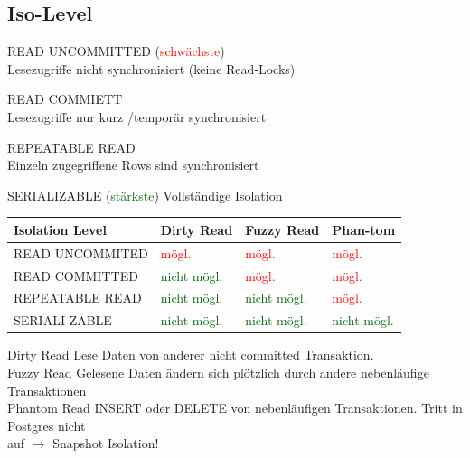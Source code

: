 \documentclass[10pt,landscape,a4paper]{scrartcl}
\begin{document}
\begin{multicols*}{5}
\subsection{Iso-Level}
\begin{compactitem} [$\bullet$]
	\item \textcolor{b}{READ UNCOMMITTED} (\textcolor{red}{schwächste})\\
	Lesezugriffe nicht synchronisiert (keine Read-Locks) 
	\item \textcolor{b}{READ COMMIETT}\\
	Lesezugriffe nur kurz /temporär synchronisiert
	\item \textcolor{b}{REPEATABLE READ}\\
	Einzeln zugegriffene Rows sind synchronisiert
	\item \textcolor{b}{SERIALIZABLE} (\textcolor{darkgreen}{stärkste})
	Vollständige Isolation
\end{compactitem}
\begin{tabular}{|p{1.9cm}|p{.7cm}|p{.7cm}|p{.7cm}|}
	\hline
	Isolation \newline Level&Dirty Read&Fuzzy Read&Phan-tom\\
	\hline
	\hline
	READ UNCOMMITED&\textcolor{red}{mögl.}&\textcolor{red}{mögl.}&\textcolor{red}{mögl.}\\
	\hline
	READ \newline COMMITTED&\textcolor{darkgreen}{nicht mögl.}&\textcolor{red}{mögl.}&\textcolor{red}{mögl.}\\
	\hline
	REPEATABLE READ&\textcolor{darkgreen}{nicht mögl.}&\textcolor{darkgreen}{nicht mögl.}&\textcolor{red}{mögl.}\\
	\hline
	SERIALI-ZABLE&\textcolor{darkgreen}{nicht mögl.}&\textcolor{darkgreen}{nicht mögl.}&\textcolor{darkgreen}{nicht mögl.}\\
	\hline
\end{tabular}
\textcolor{b}{Dirty Read} Lese Daten von anderer nicht committed Transaktion.\\
\textcolor{b}{Fuzzy Read} Gelesene Daten ändern sich plötzlich durch andere nebenläufige Transaktionen\\
\textcolor{b}{Phantom Read} INSERT oder DELETE von nebenläufigen Transaktionen. Tritt in Postgres nicht\\ auf $\rightarrow$ Snapshot Isolation!
\vspace{-8pt}

\end{multicols*}
\end{document}
